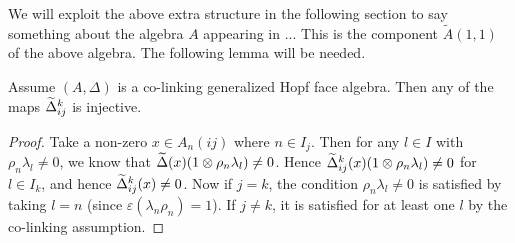 We will exploit the above extra structure in the following section to say something about the algebra $A$ appearing in ... This is the component $\tilde{A}(1,1)$ of the above algebra. The following lemma will be needed.

\begin{Lem} Assume $(A,\Delta)$ is a co-linking generalized Hopf face algebra. Then any of the maps $\widetilde{\Delta}_{ij}^k$ is injective.\end{Lem}

\begin{proof} Take a non-zero $x\in A_n(ij)$ where $n\in I_j$. Then for any $l\in I$ with $\rho_n\lambda_l\neq 0$, we know that $\widetilde{\Delta}(x)(1\otimes \rho_n\lambda_l)\neq 0$. Hence $\widetilde{\Delta}_{ij}^k(x)(1\otimes \rho_n\lambda_l)\neq 0$ for $l\in I_k$, and hence $\widetilde{\Delta}_{ij}^k(x)\neq 0$. Now if $j=k$, the condition $\rho_n\lambda_l\neq 0$ is satisfied by taking $l=n$ (since $\varepsilon(\lambda_n\rho_n)=1$). If $j\neq k$, it is satisfied for at least one $l$ by the co-linking assumption.
\end{proof}



